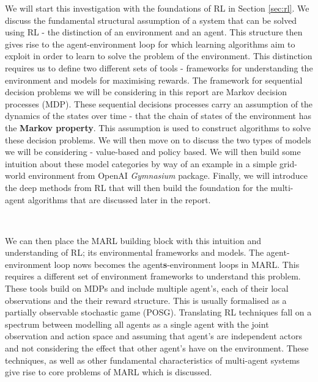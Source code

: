 \documentclass{article}
\begin{document}
We will start this investigation with the foundations of RL in Section \ref{sec:rl}. We discuss the fundamental structural assumption of a system that can be solved using RL - the distinction of an environment and an agent. This structure then gives rise to the agent-environment loop for which learning algorithms aim to exploit in order to learn to solve the problem of the environment.  This distinction requires us to define two different sets of tools - frameworks for understanding the environment and models for maximising rewards. The framework for sequential decision problems we will be considering in this report are Markov decision processes (MDP). These sequential decisions processes carry an assumption of the dynamics of the states over time - that the chain of states of the environment has the \textbf{Markov property}. This assumption is used to construct algorithms to solve these decision problems. We will then move on to discuss the two types of models we will be considering - value-based and policy based. We will then build some intuition about these model categories by way of an example in a simple grid-world environment from OpenAI \textit{Gymnasium} \citep{kwiatkowski2024gymnasium} package. Finally, we will introduce the deep methods from RL that will then build the foundation for the multi-agent algorithms that are discussed later in the report.

\ 
 
We can then place the MARL building block with this intuition and understanding of RL; its environmental frameworks and models. The agent-environment loop nows becomes the agent\textbf{s}-environment loops in MARL. This requires a different set of environment frameworks to understand this problem. These tools build on MDPs and include multiple agent's, each of their local observations and the their reward structure. This is usually formalised as a partially observable stochastic game (POSG). Translating RL techniques fall on a spectrum between modelling all agents as a single agent with the joint observation and action space and assuming that agent's are independent actors and not considering the effect that other agent's have on the environment. These techniques, as well as other fundamental characteristics of multi-agent systems give rise to core problems of MARL which is discussed.


\
\end{document}
